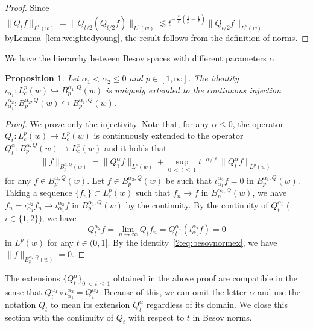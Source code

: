\documentclass[10pt]{amsart}
\newtheorem{prop}[theo]{Proposition}
\theoremstyle{definition}
\numberwithin{equation}{section}
\newcommand{\mfs}{\mathfrak{s}}
\begin{document}
\begin{proof}
Since $\|Q_tf\|_{L^r(w)}=\|Q_{t/2}(Q_{t/2}f)\|_{L^r(w)}\lesssim t^{-\frac{|\mfs|}\ell(\frac1p-\frac1r)}\|Q_{t/2}f\|_{L^p(w)}$ by\linebreak Lemma~\ref{lem:weightedyoung}, the result follows from the definition of norms.
\end{proof}

We have the hierarchy between Besov spaces with different parameters $\alpha$.

\begin{prop}\label{prop:abinjection}
Let $\alpha_1<\alpha_2\le0$ and $p\in[1,\infty]$. The identity $\iota_{\alpha_1}:L_c^p(w)\hookrightarrow B_p^{\alpha_1,Q}(w)$ is uniquely extended to the continuous injection $\iota_{\alpha_1}^{\alpha_2}:B_p^{\alpha_2,Q}(w)\hookrightarrow B_p^{\alpha_1,Q}(w)$.
\end{prop}

\begin{proof}
We prove only the injectivity. Note that, for any $\alpha\le0$, the operator $Q_t:L_c^p(w)\to L_c^p(w)$ is continuously extended to the operator $Q_t^\alpha:B_p^{\alpha,Q}(w)\to L_c^p(w)$ and it holds that
\begin{align}\label{2:eq:besovnormex}
\|f\|_{B_p^{\alpha,Q}(w)}=\|Q_1^\alpha f\|_{L^p(w)}+\sup_{0\,<\,t\,\le\,1}t^{-\alpha/\ell}\|Q_t^\alpha f\|_{L^p(w)}
\end{align}
for any $f\in B_p^{\alpha,Q}(w)$. Let $f\in B_p^{\alpha_2,Q}(w)$ be such that $\iota_{\alpha_1}^{\alpha_2} f=0$ in $B_p^{\alpha_1,Q}(w)$. Taking a sequence $\{f_n\}\subset L_c^p(w)$ such that $f_n\to f$ in $B_p^{\alpha_2,Q}(w)$, we have $f_n=\iota_{\alpha_1}^{\alpha_2}f_n\to\iota_{\alpha_1}^{\alpha_2}f$ in $B_p^{\alpha_1,Q}(w)$ by the continuity. By the continuity of $Q_t^{\alpha_i}$ ($i\in\{1,2\}$), we have
\[
Q_t^{\alpha_2}f=\lim_{n\to\infty}Q_tf_n=Q_t^{\alpha_1}\left(\iota_{\alpha_1}^{\alpha_2}f\right)=0
\]
in $L^p(w)$ for any $t\in(0,1]$. By the identity~\eqref{2:eq:besovnormex}, we have $\|f\|_{B_p^{\alpha_2,Q}(w)}=0$.
\end{proof}

The extensions $\{Q_t^\alpha\}_{0\,<\,t\,\le\,1}$ obtained in the above proof are compatible in the sense that $Q_t^{\alpha_1}\circ\iota_{\alpha_1}^{\alpha_2}=Q_t^{\alpha_2}$. Because of this, we can omit the letter $\alpha$ and use the notation $Q_t$ to mean its extension $Q_t^\alpha$ regardless of its domain. We close this section with the continuity of $Q_t$ with respect to $t$ in Besov norms.
\end{document}
